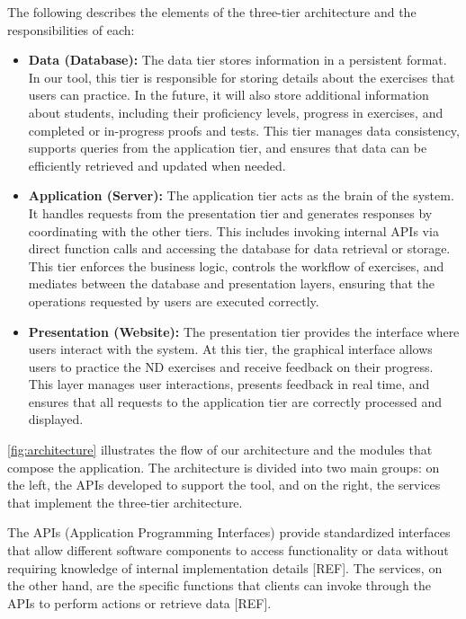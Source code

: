 The following describes the elements of the three-tier architecture and the responsibilities of each:
\begin{itemize}[label={}, leftmargin=0pt]
    \item \textbf{Data (Database):} The data tier stores information in a persistent format. In our tool, this tier is responsible for storing details about the exercises that users can practice. In the future, it will also store additional information about students, including their proficiency levels, progress in exercises, and completed or in-progress proofs and tests. This tier manages data consistency, supports queries from the application tier, and ensures that data can be efficiently retrieved and updated when needed.

    \item \textbf{Application (Server):} The application tier acts as the brain of the system. It handles requests from the presentation tier and generates responses by coordinating with the other tiers. This includes invoking internal APIs via direct function calls and accessing the database for data retrieval or storage. This tier enforces the business logic, controls the workflow of exercises, and mediates between the database and presentation layers, ensuring that the operations requested by users are executed correctly.

    \item \textbf{Presentation (Website):} The presentation tier provides the interface where users interact with the system. At this tier, the graphical interface allows users to practice the \gls{ND} exercises and receive feedback on their progress. This layer manages user interactions, presents feedback in real time, and ensures that all requests to the application tier are correctly processed and displayed.
\end{itemize}

\autoref{fig:architecture} illustrates the flow of our architecture and the modules that compose the application. The architecture is divided into two main groups: on the left, the APIs developed to support the tool, and on the right, the services that implement the three-tier architecture.

The APIs (Application Programming Interfaces) provide standardized interfaces that allow different software components to access functionality or data without requiring knowledge of internal implementation details [REF]. The services, on the other hand, are the specific functions that clients can invoke through the APIs to perform actions or retrieve data [REF].


